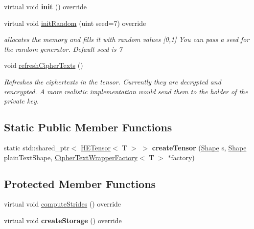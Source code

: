 \begin{DoxyCompactItemize}
\mbox{\label{classHETensor_a9b58e05ba89b3c66084e33ca5423bbb6}} 
virtual void {\bfseries init} () override
\item 
\mbox{\label{classHETensor_a171fd555451e5b9d6e71ebb871d368a3}} 
virtual void \hyperlink{classHETensor_a171fd555451e5b9d6e71ebb871d368a3}{init\+Random} (uint seed=7) override
\begin{DoxyCompactList}\small\item\em allocates the memory and fills it with random values \mbox{[}0,1\mbox{]} You can pass a seed for the random generator. Default seed is 7 \end{DoxyCompactList}\item 
\mbox{\label{classHETensor_ac22b8062f261724d8a6a810d60a0d1cd}} 
void \hyperlink{classHETensor_ac22b8062f261724d8a6a810d60a0d1cd}{refresh\+Cipher\+Texts} ()
\begin{DoxyCompactList}\small\item\em Refreshes the ciphertexts in the tensor. Currently they are decrypted and rencrypted. A more realistic implementation would send them to the holder of the private key. \end{DoxyCompactList}\end{DoxyCompactItemize}
\subsection*{Static Public Member Functions}
\begin{DoxyCompactItemize}
\item 
\mbox{\label{classHETensor_a1b771ebed43f0ee13398a72837313ce4}} 
static std\+::shared\+\_\+ptr$<$ \hyperlink{classHETensor}{H\+E\+Tensor}$<$ T $>$ $>$ {\bfseries create\+Tensor} (\hyperlink{classShape}{Shape} s, \hyperlink{classShape}{Shape} plain\+Text\+Shape, \hyperlink{classCipherTextWrapperFactory}{Cipher\+Text\+Wrapper\+Factory}$<$ T $>$ $\ast$factory)
\end{DoxyCompactItemize}
\subsection*{Protected Member Functions}
\begin{DoxyCompactItemize}
\item 
virtual void \hyperlink{classHETensor_ab0b9ca7b3826bc6c385514523e29de06}{compute\+Strides} () override
\item 
\mbox{\label{classHETensor_a6c6723c9443c99e93b7135b6cd3d746e}} 
virtual void {\bfseries create\+Storage} () override
\end{DoxyCompactItemize}
